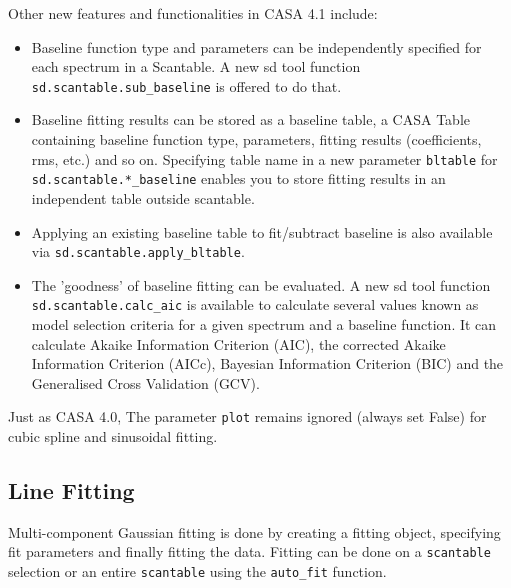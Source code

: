 Other new features and functionalities in CASA 4.1 include:
\begin{itemize}
\item Baseline function type and parameters can be independently specified for each spectrum in a Scantable. A new sd tool function {\tt sd.scantable.sub\_baseline} is offered to do that. 
\item Baseline fitting results can be stored as a baseline table, a CASA Table containing baseline function type, parameters, fitting results (coefficients, rms, etc.) and so on. Specifying table name in a new parameter {\tt bltable} for {\tt sd.scantable.*\_baseline} enables you to store fitting results in an independent table outside scantable. 
\item Applying an existing baseline table to fit/subtract baseline is also available via {\tt sd.scantable.apply\_bltable}.
\item The 'goodness' of baseline fitting can be evaluated. A new sd tool function {\tt sd.scantable.calc\_aic} is available to calculate several values known as model selection criteria for a given spectrum and a baseline function. It can calculate Akaike Information Criterion (AIC), the corrected Akaike Information Criterion (AICc), Bayesian Information Criterion (BIC) and the Generalised Cross Validation (GCV). 
\end{itemize}

Just as CASA 4.0, The parameter {\tt plot} remains ignored (always 
set False) for cubic spline and sinusoidal fitting. 

\subsection{Line Fitting}
\label{subsection:sd.asap.LINEfitting}

Multi-component Gaussian fitting is done by
creating a fitting object, specifying fit parameters and finally
fitting the data. Fitting can be done on a {\tt scantable} selection
or an entire {\tt scantable} using the {\tt auto\_fit} function.

